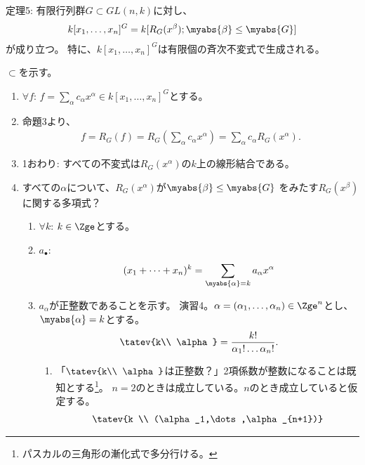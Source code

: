 \begin{framed}
  定理5:
  有限行列群$G\subset GL(n,k)$に対し、
  \begin{align}
    k[x_1,\dots,x_n]^G  = k[R_G(x^\beta); \myabs{\beta}\le \myabs{G}]
  \end{align}
  が成り立つ。
  特に、$k[x_1,\dots,x_n]^G$は有限個の斉次不変式で生成される。
\end{framed}
\begin{myproof}
  $\subset$を示す。
  \begin{enumerate}
    \item $\forall f$: $f=\sum_{\alpha} c_\alpha x^\alpha \in k[x_1,\dots,x_n]^G$とする。
    \item
    命題3より、
    \begin{align}
      f=R_G(f)
      =
      R_G(\sum_{\alpha}c_\alpha x^\alpha)
      =
      \sum_{\alpha}c_\alpha R_G(x^\alpha).
    \end{align}
    \item
    1おわり:
     すべての不変式は$R_G(x^\alpha)$の$k$上の線形結合である。
    \item
    すべての$\alpha$について、$R_G(x^\alpha)$が$\myabs{\beta} \le \myabs{G}$
    をみたす$R_G(x^\beta)$に関する多項式？
     \begin{enumerate}
       \item $\forall k$:
       $k\in \Zge$とする。
       \item
       $a_\bullet$:
       \begin{align}
         (x_1+\dots+x_n)^k = \sum_{\myabs{\alpha}=k}a_\alpha x^\alpha
       \end{align}
       \item
       $a_\alpha$が正整数であることを示す。
       演習4。$\alpha=(\alpha_1,\dots,\alpha_n)\in \Zge^n$とし、
       $\myabs{\alpha} = k$とする。
       \begin{align}
         \tatev{k\\ \alpha} = \frac{k!}{\alpha_1! \dots \alpha_n!}.
       \end{align}
       \begin{enumerate}
         \item
         「$\tatev{k\\ \alpha}$は正整数？」2項係数が整数になることは既知とする\footnote{パスカルの三角形の漸化式で多分行ける。}。
         $n=2$のときは成立している。$n$のとき成立していると仮定する。
         \begin{align}
           \tatev{k \\ (\alpha_1,\dots,\alpha_{n+1})}

\end{align}
\end{enumerate}
\end{enumerate}
\end{enumerate}
\end{myproof}
